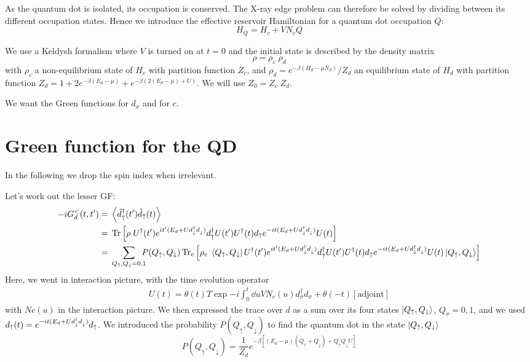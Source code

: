 \documentclass[12pt]{article}
\newcommand\up{\uparrow}
\newcommand\dn{\downarrow}
\newcommand\nodag{{\vphantom{\dagger}}}
\begin{document}
As the quantum dot is isolated, its occupation is conserved. The X-ray edge problem can therefore be solved by dividing between its different occupation states. Hence we introduce the effective reservoir Hamiltonian for a quantum dot occupation $Q$:
\begin{equation}
	H_Q = H_c + V N_c Q
\end{equation}


We use a Keldysh formalism where $V$ is turned on at $t=0$ and the initial state is described by the density matrix
\begin{equation}
	\rho = \rho_c \; \rho_d
\end{equation}
with $\rho_c$ a non-equilibrium state of $H_c$ with partition function $Z_c$, and $\rho_d = e^{-\beta(H_d - \mu N_d)} / Z_d$ an equilibrium state of $H_d$ with partition function $Z_d = 1 + 2e^{-\beta(E_d - \mu)} + e^{-\beta(2(E_d - \mu) + U)}$. We will use $Z_0 = Z_c \; Z_d$.

We want the Green functions for $d_\sigma$ and for $c$.

\section{Green function for the \acf{QD}}

In the following we drop the spin index when irrelevant.

Let's work out the lesser \ac{GF}:
\begin{align}
	-i G^<_d(t, t') ={}& \expval{\tilde d_\up^\dagger(t') \tilde d_\up(t)}
	\\
	={}& \Tr \qty[\rho \; U^\dagger(t') e^{it'(E_d + U d^\dag_\dn d^\nodag_\dn)} d_\up^\dagger U(t') U^\dagger(t) d_\up e^{-it(E_d + U d^\dag_\dn d^\nodag_\dn)} U(t)]
	\\
	={}& \sum_{Q_\up, Q_\dn=0,1} \!\!\!\! P(Q_\up, Q_\dn) \Tr_c \qty[\rho_c \; \bra{Q_\up, Q_\dn} U^\dagger(t') e^{it'(E_d + U d^\dag_\dn d^\nodag_\dn)} d_\up^\dagger U(t') U^\dagger(t) d_\up e^{-it(E_d + U d^\dag_\dn d^\nodag_\dn)} U(t) \ket{Q_\up, Q_\dn}]
\end{align}
Here, we went in interaction picture, with the time evolution operator
\begin{gather}
	U(t) = \theta(t) T \exp{-i \int_0^t \dd{u} V N_c(u) d_\sigma^\dagger d_\sigma} + \theta(-t) [\text{adjoint}]
\end{gather}
with $Nc(u)$ in the interaction picture. We then expressed the trace over $d$ as a sum over its four states $\ket{Q_\up, Q_\dn}$, $Q_\sigma=0, 1$, and we used $d_\up(t) = e^{-it(E_d + U d^\dag_\dn d^\nodag_\dn)} d_\up$.
We introduced the probability $P(Q_\up, Q_\dn)$ to find the quantum dot in the state  $\ket{Q_\up, Q_\dn}$
\begin{equation}
	P(Q_\up, Q_\dn) = \frac{1}{Z_d} e^{-\beta[(E_d - \mu) (Q_\up + Q_\dn) + Q_\up Q_\dn U]}
\end{equation}
\end{document}

